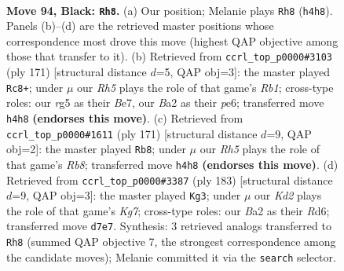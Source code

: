 \documentclass[11pt]{article}
\begin{document}
\clearpage

\begin{figure}[p]\centering
\begin{subfigure}{0.46\textwidth}\centering
\resizebox{\linewidth}{!}{%
\newchessgame
\chessboard[
  setfen={8/3k4/1P3R2/6R1/7r/4K3/b7/8 b - - 8 94},
  showmover=false,
  pgfstyle=straightmove, color=movearrow, markmove={h4-h8}
]}
\caption{}
\end{subfigure}\hfill
\begin{subfigure}{0.46\textwidth}\centering
\resizebox{\linewidth}{!}{%
\newchessgame
\chessboard[
  setfen={1r6/4b2k/4P3/P7/2K5/8/8/R7 b - - 0 86},
  showmover=false,
  pgfstyle=straightmove, color=movearrow, markmove={b8-c8}
]}
\caption{}
\end{subfigure}
\\[4pt]
\begin{subfigure}{0.46\textwidth}\centering
\resizebox{\linewidth}{!}{%
\newchessgame
\chessboard[
  setfen={8/8/3k4/8/3P3R/8/4K3/1r6 b - - 0 86},
  showmover=false,
  pgfstyle=straightmove, color=movearrow, markmove={b1-b8}
]}
\caption{}
\end{subfigure}\hfill
\begin{subfigure}{0.46\textwidth}\centering
\resizebox{\linewidth}{!}{%
\newchessgame
\chessboard[
  setfen={1R6/r7/3r4/8/7R/1K6/6k1/8 b - - 19 92},
  showmover=false,
  pgfstyle=straightmove, color=movearrow, markmove={g2-g3}
]}
\caption{}
\end{subfigure}
\caption{\textbf{Move 94, Black: \texttt{Rh8}.} (a) Our position; Melanie plays \texttt{Rh8} (\texttt{h4h8}). Panels (b)--(d) are the retrieved master positions whose correspondence most drove this move (highest QAP objective among those that transfer to it). (b) Retrieved from \texttt{ccrl\_top\_p0000\#3103} (ply 171) [structural distance $d$=5, QAP obj=3]: the master played \texttt{Rc8+}; under $\mu$ our \emph{Rh5} plays the role of that game's \emph{Rb1}; cross-type roles: our \emph{r}g5 as their \emph{B}e7, our \emph{B}a2 as their \emph{p}e6; transferred move \texttt{h4h8} \textbf{(endorses this move)}. (c) Retrieved from \texttt{ccrl\_top\_p0000\#1611} (ply 171) [structural distance $d$=9, QAP obj=2]: the master played \texttt{Rb8}; under $\mu$ our \emph{Rh5} plays the role of that game's \emph{Rb8}; transferred move \texttt{h4h8} \textbf{(endorses this move)}. (d) Retrieved from \texttt{ccrl\_top\_p0000\#3387} (ply 183) [structural distance $d$=9, QAP obj=3]: the master played \texttt{Kg3}; under $\mu$ our \emph{Kd2} plays the role of that game's \emph{Kg7}; cross-type roles: our \emph{B}a2 as their \emph{R}d6; transferred move \texttt{d7e7}. Synthesis: 3 retrieved analogs transferred to \texttt{Rh8} (summed QAP objective 7, the strongest correspondence among the candidate moves); Melanie committed it via the \texttt{search} selector.}
\label{fig:thought-m187}
\end{figure}
\end{document}
